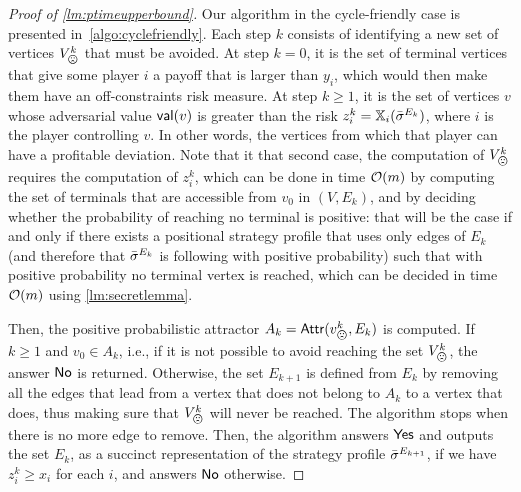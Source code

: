 \begin{proof}[Proof of \cref{lm:ptimeupperbound}]
     
    Our algorithm in the cycle-friendly case is presented in~\cref{algo:cyclefriendly}.
    Each step $k$ consists of identifying a new set of vertices $V_\bad^k$ that must be avoided.
    At step $k=0$, it is the set of terminal vertices that give some player $i$ a payoff that is larger than $y_i$, which would then make them have an off-constraints risk measure.
    At step $k \geq 1$, it is the set of vertices $v$ whose adversarial value $\mathsf{val}(v)$ is greater than the risk $z_i^k = \mathbb{X}_i({\bar{\sigma}}^{E_k})$, where $i$ is the player controlling $v$.
    In other words, the vertices from which that player can have a profitable deviation.
    Note that it that second case, the computation of $V_\bad^k$ requires the computation of $z_i^k$, which can be done in time $\mathcal{O}(m)$ by computing the set of terminals that are accessible from $v_0$ in $(V, E_k)$, and by deciding whether the probability of reaching no terminal is positive: that will be the case if and only if there exists a positional strategy profile that uses only edges of $E_k$ (and therefore that ${\bar{\sigma}}^{E_k}$ is following with positive probability) such that with positive probability no terminal vertex is reached, which can be decided in time $\mathcal{O}(m)$ using \cref{lm:secretlemma}.

     
    
    Then, the positive probabilistic attractor $A_k = \Attr(v_\bad^k, E_k)$ is computed.
    If $k \geq 1$ and $v_0 \in A_k$, i.e., if it is not possible to avoid reaching the set $V_\bad^k$, the answer $\mathsf{No}$ is returned.
    Otherwise, the set $E_{k+1}$ is defined from $E_k$ by removing all the edges that lead from a vertex that does not belong to $A_k$ to a vertex that does, thus making sure that $V_\bad^k$ will never be reached.
    The algorithm stops when there is no more edge to remove.
    Then, the algorithm answers $\mathsf{Yes}$ and outputs the set $E_k$, as a succinct representation of the strategy profile ${\bar{\sigma}}^{E_{k+1}}$, if we have $z_i^k \geq x_i$ for each $i$, and answers $\mathsf{No}$ otherwise.

     
    

\end{proof}
